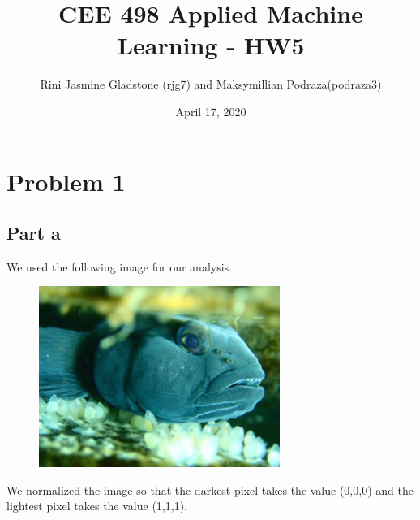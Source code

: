 \documentclass{article}      %
\title{CEE 498 Applied Machine Learning - HW5}  %
\author{Rini Jasmine Gladstone (rjg7) and Maksymillian Podraza(podraza3)}      %
\date{April 17, 2020}      %
\begin{document}

\maketitle                   %


\section{Problem 1}      %

\subsection{Part a}

We used the following image for our analysis.

\begin{figure}[H]
\centering
\includegraphics[width=0.7\textwidth]{RobertMixed03.jpg}
\end{figure}

We normalized the image so that the darkest pixel takes the value (0,0,0) and the lightest pixel takes the value (1,1,1).
\end{document}
